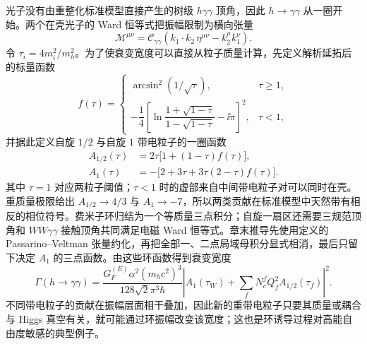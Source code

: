 光子没有由重整化标准模型直接产生的树级 $h\gamma\gamma$ 顶角，因此 $h\to\gamma\gamma$ 从一圈开始。两个在壳光子的 Ward 恒等式把振幅限制为横向张量
\begin{equation}
\mathcal M^{\mu\nu}
=\mathcal C_{\gamma\gamma}
\left(k_1\cdot k_2\,\eta^{\mu\nu}-k_2^\mu k_1^\nu\right).
\label{eq:hggamma-transverse-tensor-dp11}
\end{equation}
令 $\tau_i=4m_i^2/m_h^2$。为了使衰变宽度可以直接从粒子质量计算，先定义解析延拓后的标量函数
\begin{equation*}
 f(\tau)=
 \begin{cases}
 \arcsin^2(1/\sqrt\tau),&\tau\ge1,\\[4pt]
 -\dfrac14\left[
 \ln\dfrac{1+\sqrt{1-\tau}}{1-\sqrt{1-\tau}}-\ii\pi
 \right]^2,&\tau<1,
 \end{cases}
\end{equation*}
并据此定义自旋 $1/2$ 与自旋 $1$ 带电粒子的一圈函数
\begin{equation}
{
\begin{aligned}
 A_{1/2}(\tau)&=2\tau\bigl[1+(1-\tau)f(\tau)\bigr],\\
 A_1(\tau)&=-\bigl[2+3\tau+3\tau(2-\tau)f(\tau)\bigr].
\end{aligned}}
\label{eq:sm-hgamma-loop-functions-dp41}
\end{equation}
其中 $\tau=1$ 对应两粒子阈值；$\tau<1$ 时的虚部来自中间带电粒子对可以同时在壳。重质量极限给出 $A_{1/2}\to4/3$ 与 $A_1\to-7$，所以两类贡献在标准模型中天然带有相反的相位符号。费米子环归结为一个等质量三点积分；自旋一扇区还需要三规范顶角和 $WW\gamma\gamma$ 接触顶角共同满足电磁 Ward 恒等式。章末推导先使用定义的 Passarino--Veltman 张量约化，再把全部一、二点局域母积分显式相消，最后只留下决定 $A_1$ 的三点函数。由这些环函数得到衰变宽度
\begin{equation}
{
\Gamma(h\to\gamma\gamma)
=\frac{G_F^{(E)}\alpha^2(m_hc^2)^3}
{128\sqrt2\pi^3\hbar}
\left|
A_1(\tau_W)
+\sum_fN_c^fQ_f^2A_{1/2}(\tau_f)
\right|^2.}
\label{eq:h-to-gammagamma-dp11}
\end{equation}
不同带电粒子的贡献在振幅层面相干叠加，因此新的重带电粒子只要其质量或耦合与 Higgs 真空有关，就可能通过环振幅改变该宽度；这也是环诱导过程对高能自由度敏感的典型例子。

